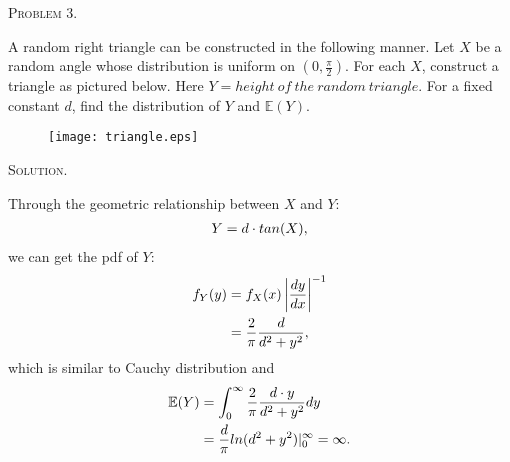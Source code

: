 \documentclass{article}
\begin{document}
\begin{CJK}{UTF8}{gbsn}
    \begin{shaded}
        \noindent\textsc{Problem 3.}\par
        A random right triangle can be constructed in the following manner. Let $X$ be a random
        angle whose distribution is uniform on $(0, \frac{\pi}{2})$. For each $X$, construct a triangle
        as pictured below. Here $Y=height\ of\ the\ random\ triangle$. For a fixed constant $d$, find
        the distribution of $Y$ and $\mathbb{E}(Y)$.
    \end{shaded}
    \begin{figure}[htbp]
        \centering
        \texttt{[image: triangle.eps]}
        \label{figure}
    \end{figure}
    \noindent\textsc{Solution.}\par
    Through the geometric relationship between $X$ and  $Y$:
    \begin{align}
        Y=d\cdot tan(X),\notag
    \end{align}
    we can get the pdf of $Y$:
    \begin{align}
        f_Y(y) & =f_X(x)\left | \frac{dy}{dx}\right |^{-1} \notag \\
               & =\frac{2}{\pi} \frac{d}{d^2+y^2},\notag
    \end{align}
    which is similar to Cauchy distribution and
    \begin{align}
        \mathbb{E}(Y) & = \int_0^{\infty}\frac{2}{\pi}\frac{d\cdot y}{d^2+y^2}dy\notag \\
                      & = \frac{d}{\pi} ln(d^2+y^2)|_0^{\infty} = \infty.\notag
    \end{align}




\end{CJK}
\end{document}
